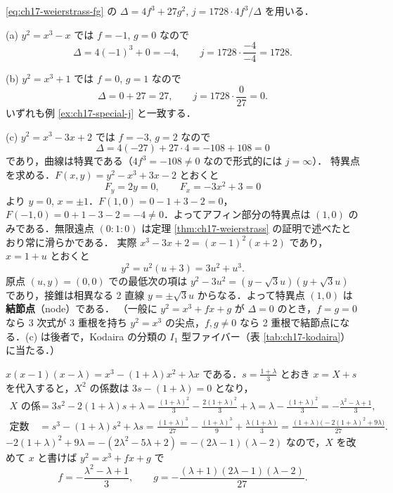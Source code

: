 \eqref{eq:ch17-weierstrass-fg} の $\Delta=4f^3+27g^2$, $j=1728\cdot4f^3/\Delta$ を用いる．

(a) $y^2=x^3-x$ では $f=-1$, $g=0$ なので
\[
\Delta=4(-1)^3+0=-4,\qquad j=1728\cdot\frac{-4}{-4}=1728 .
\]

(b) $y^2=x^3+1$ では $f=0$, $g=1$ なので
\[
\Delta=0+27=27,\qquad j=1728\cdot\frac{0}{27}=0 .
\]
いずれも例 \ref{ex:ch17-special-j} と一致する．

(c) $y^2=x^3-3x+2$ では $f=-3$, $g=2$ なので
\[
\Delta=4(-27)+27\cdot4=-108+108=0
\]
であり，曲線は特異である（$4f^3=-108\neq0$ なので形式的には $j=\infty$）．
特異点を求める．$F(x,y)=y^2-x^3+3x-2$ とおくと
\[
F_y=2y=0,\qquad F_x=-3x^2+3=0
\]
より $y=0$, $x=\pm1$．$F(1,0)=0-1+3-2=0$，$F(-1,0)=0+1-3-2=-4\neq0$．よってアフィン部分の特異点は $(1,0)$ のみである．無限遠点 $(0:1:0)$ は定理 \ref{thm:ch17-weierstrass} の証明で述べたとおり常に滑らかである．
実際 $x^3-3x+2=(x-1)^2(x+2)$ であり，$x=1+u$ とおくと
\[
y^2=u^2(u+3)=3u^2+u^3 .
\]
原点 $(u,y)=(0,0)$ での最低次の項は $y^2-3u^2=(y-\sqrt3u)(y+\sqrt3u)$ であり，接錐は相異なる 2 直線 $y=\pm\sqrt3u$ からなる．よって特異点 $(1,0)$ は\textbf{結節点}（node）である．
（一般に $y^2=x^3+fx+g$ が $\Delta=0$ のとき，$f=g=0$ なら 3 次式が 3 重根を持ち $y^2=x^3$ の尖点，$f,g\neq0$ なら 2 重根で結節点になる．(c) は後者で，Kodaira の分類の $I_1$ 型ファイバー（表 \ref{tab:ch17-kodaira}）に当たる．）

$x(x-1)(x-\lambda)=x^3-(1+\lambda)x^2+\lambda x$ である．$s=\frac{1+\lambda}3$ とおき $x=X+s$ を代入すると，$X^2$ の係数は $3s-(1+\lambda)=0$ となり，
\[
\begin{aligned}
X\text{ の係数}&=3s^2-2(1+\lambda)s+\lambda=\frac{(1+\lambda)^2}{3}-\frac{2(1+\lambda)^2}{3}+\lambda=\lambda-\frac{(1+\lambda)^2}{3}=-\frac{\lambda^2-\lambda+1}{3},\\
\text{定数項}&=s^3-(1+\lambda)s^2+\lambda s=\frac{(1+\lambda)^3}{27}-\frac{(1+\lambda)^3}{9}+\frac{\lambda(1+\lambda)}{3}
=\frac{(1+\lambda)\bigl(-2(1+\lambda)^2+9\lambda\bigr)}{27}.
\end{aligned}
\]
$-2(1+\lambda)^2+9\lambda=-(2\lambda^2-5\lambda+2)=-(2\lambda-1)(\lambda-2)$ なので，$X$ を改めて $x$ と書けば $y^2=x^3+fx+g$ で
\[
f=-\frac{\lambda^2-\lambda+1}{3},\qquad g=-\frac{(\lambda+1)(2\lambda-1)(\lambda-2)}{27}.
\]

